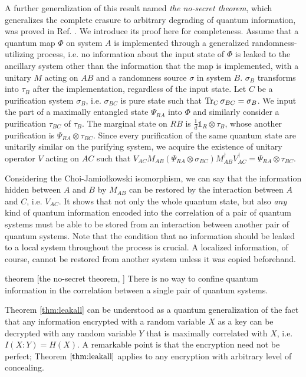 \documentclass[aps, reprint, amsmath,amssymb, prx, superscriptaddress]{revtex4-2}
\begin{document}
A further generalization of this result named \textit{the no-secret theorem}, which generalizes the complete erasure to arbitrary degrading of quantum information, was proved in Ref. \cite{lie2020uniform}. We introduce its proof here for completeness. Assume that a quantum map $\Phi$ on system $A$ is implemented through a generalized randomness-utilizing process, i.e. no information about the input state of $\Phi$ is leaked to the ancillary system other than the information that the map is implemented, with a unitary $M$ acting on $AB$ and a randomness source $\sigma$ in system $B$. $\sigma_B$ transforms into $\tau_B$ after the implementation, regardless of the input state.  Let $C$ be a purification system $\sigma_B$, i.e. $\sigma_{BC}$ is pure state such that $\Tr_C\sigma_{BC}=\sigma_B$. We input the part of a maximally entangled state $\Psi_{RA}$ into $\Phi$ and similarly consider a purification $\tau_{BC}$ of $\tau_B$. The marginal state on $RB$ is $\frac{1}{d}\mathds{1}_R\otimes \tau_B$, whose another purification is $\Psi_{RA}\otimes \tau_{BC}$. Since every purification of the same quantum state are unitarily similar on the purifying system, we acquire the existence of unitary operator $V$ acting on $AC$ such that $V_{AC}M_{AB}(\Psi_{RA}\otimes\sigma_{BC})M_{AB}^\dag V_{AC}^\dag = \Psi_{RA}\otimes \tau_{BC}$.

Considering the Choi-Jamiołkowski isomorphism, we can say that the information hidden between $A$ and $B$ by $M_{AB}$ can be restored  by the interaction between $A$ and $C$, i.e. $V_{AC}$. It shows that not only the whole quantum state, but also \textit{any} kind of quantum information encoded into the correlation of a pair of quantum systems must be able to be stored from an interaction between another pair of quantum systems. Note that the condition that no information should be leaked to a local system throughout the process is crucial. A localized information, of course, cannot be restored from another system unless it was copied beforehand.

\begin{theoremEnd}{theorem} [the no-secret theorem, \cite{lie2020uniform}] \label{thm:leakall}
    There is no way to confine quantum information in the correlation between a single pair of quantum systems.
\end{theoremEnd}
Theorem \ref{thm:leakall} can be understood as a quantum generalization of the fact that any information encrypted with a random variable $X$ as a key can be decrypted with any random variable $Y$ that is maximally correlated with $X$, i.e. $I(X:Y)=H(X)$. A remarkable point is that the encryption need not be perfect; Theorem $\ref{thm:leakall}$ applies to any encryption with arbitrary level of concealing.
\end{document}
